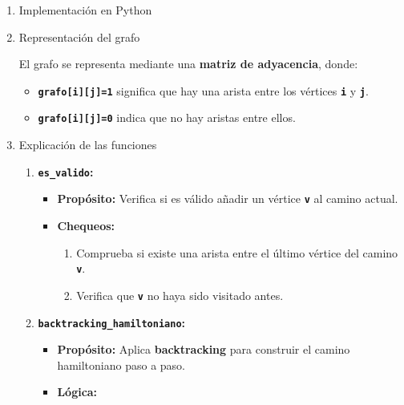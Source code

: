 \begin{enumerate}[label=\color{red}\textbf{\arabic*)}]
\begin{enumerate}[label=\arabic*)]
        \item Implementación en Python

          

        \item Representación del grafo

          El grafo se representa mediante una \textbf{matriz de adyacencia}, donde:
          \begin{itemize}[label=\textbullet]
            \item \textbf{\texttt{grafo[i][j]=1}} significa que hay una arista entre los vértices \textbf{\texttt{i}} y \textbf{\texttt{j}}.
            \item \textbf{\texttt{grafo[i][j]=0}} indica que no hay aristas entre ellos.
          \end{itemize}
        \item Explicación de las funciones
          \begin{enumerate}[label=\arabic*)]
            \item \textbf{\texttt{es\_valido}:}
              
              \begin{itemize}[label=\textbullet]
                \item \textbf{Propósito:} Verifica si es válido añadir un vértice \textbf{\texttt{v}} al camino actual.
                \item \textbf{Chequeos:}
                  \begin{enumerate}[label=\arabic*)]
                    \item Comprueba si existe una arista entre el último vértice del camino \textbf{\texttt{v}}.
                    \item Verifica que \textbf{\texttt{v}} no haya sido visitado antes.
                  \end{enumerate}
              \end{itemize}
            \item \textbf{\texttt{backtracking\_hamiltoniano}:}
            
            \begin{itemize}[label=\textbullet]
              \item \textbf{Propósito:} Aplica \textbf{backtracking} para construir el camino hamiltoniano paso a paso.
              \item \textbf{Lógica:}
                \begin{enumerate}[label=\arabic*)]

\end{enumerate}
\end{itemize}
\end{enumerate}
\end{enumerate}
\end{enumerate}
